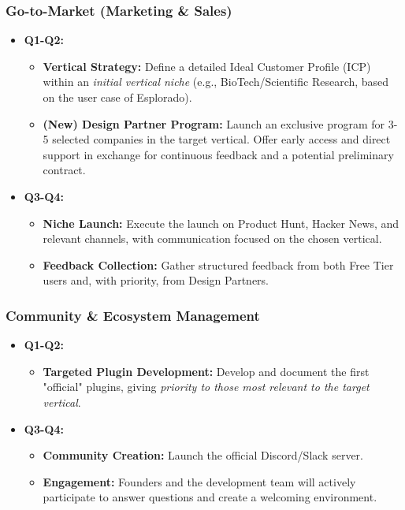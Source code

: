 \subsubsection{Go-to-Market (Marketing \& Sales)}
\begin{itemize}[leftmargin=*]
    \item \textbf{Q1-Q2:}
    \begin{itemize}
        \item \textbf{Vertical Strategy:} Define a detailed Ideal Customer Profile (ICP) within an \textit{initial vertical niche} (e.g., BioTech/Scientific Research, based on the user case of Esplorado).
        \item \textbf{(New) Design Partner Program:} Launch an exclusive program for 3-5 selected companies in the target vertical. Offer early access and direct support in exchange for continuous feedback and a potential preliminary contract.
    \end{itemize}
    \item \textbf{Q3-Q4:}
    \begin{itemize}
        \item \textbf{Niche Launch:} Execute the launch on Product Hunt, Hacker News, and relevant channels, with communication focused on the chosen vertical.
        \item \textbf{Feedback Collection:} Gather structured feedback from both Free Tier users and, with priority, from Design Partners.
    \end{itemize}
\end{itemize}

\subsubsection{Community \& Ecosystem Management}
\begin{itemize}[leftmargin=*]
    \item \textbf{Q1-Q2:}
    \begin{itemize}
        \item \textbf{Targeted Plugin Development:} Develop and document the first "official" plugins, giving \textit{priority to those most relevant to the target vertical}.
    \end{itemize}
    \item \textbf{Q3-Q4:}
    \begin{itemize}
        \item \textbf{Community Creation:} Launch the official Discord/Slack server.
        \item \textbf{Engagement:} Founders and the development team will actively participate to answer questions and create a welcoming environment.
    \end{itemize}
\end{itemize}

